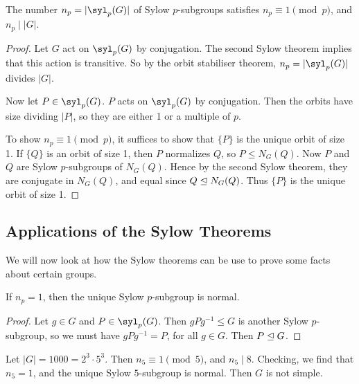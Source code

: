 \documentclass[a4paper]{scrartcl}
\begin{document}
\begin{theorem}
	The number $n_p = |\syl_p(G)|$ of Sylow $p$-subgroups satisfies $n_p \equiv 1 \pmod{p}$, and $n_p \mid |G|$.
\end{theorem}
\begin{proof}
	Let $G$ act on $\syl_p(G)$ by conjugation. The second Sylow theorem implies that this action is transitive. So by the orbit stabiliser theorem, $n_p = |\syl_p(G)|$ divides $|G|$.

	Now let $P \in \syl_p(G)$. $P$ acts on $\syl_p(G)$ by conjugation. Then the orbits have size dividing $|P|$, so they are either 1 or a multiple of $p$.

	To show $n_p \equiv 1 \pmod{p}$, it suffices to show that $\{P\}$ is the unique orbit of size 1. If $\{Q\}$ is an orbit of size 1, then $P$ normalizes $Q$, so $P \leq N_G(Q)$. Now $P$ and $Q$ are Sylow $p$-subgroups of $N_G(Q)$. Hence by the second Sylow theorem, they are conjugate in $N_G(Q)$, and equal since $Q \trianglelefteq N_G(Q)$. Thus $\{P\}$ is the unique orbit of size 1.
\end{proof}


\subsection{Applications of the Sylow Theorems}

We will now look at how the Sylow theorems can be use to prove some facts about certain groups.

\begin{corollary}
	If $n_p = 1$, then the unique Sylow $p$-subgroup is normal.
\end{corollary}
\begin{proof}
Let $g \in G$ and $P \in \syl_p(G)$. Then $gPg^{-1} \leq G$ is another Sylow $p$-subgroup, so we must have $gPg^{-1} = P$, for all $g \in G$. Then $P \trianglelefteq G$.
\end{proof}

\begin{example}
Let $|G| = 1000 = 2^3 \cdot 5^3$. Then $n_5 \equiv 1 \pmod{5}$, and $n_5 \mid 8$. Checking, we find that $n_5 = 1$, and the unique Sylow $5$-subgroup is normal. Then $G$ is not simple.
\end{example}
\end{document}
